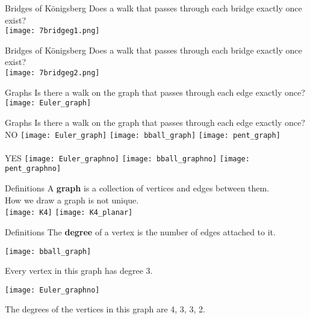 \documentclass{beamer}
\begin{document}
\begin{frame}{Bridges of Königsberg}
\centering
Does a walk that passes through each bridge exactly once exist?\\
\texttt{[image: 7bridgeg1.png]}
\end{frame}

\begin{frame}{Bridges of Königsberg}
\centering
Does a walk that passes through each bridge exactly once exist?\\
\texttt{[image: 7bridgeg2.png]}
\end{frame}
\begin{frame}{Graphs}
Is there a walk on the graph that passes through each edge exactly once?\\
\centering
\texttt{[image: Euler\_graph]}
\end{frame}
\begin{frame}{Graphs}
Is there a walk on the graph that passes through each edge exactly once?\\
NO \hfill
\texttt{[image: Euler\_graph]}\hfill
\texttt{[image: bball\_graph]}\hfill
\texttt{[image: pent\_graph]}\\
\hrulefill\vspace*{.2cm}\\
YES \hfill
\texttt{[image: Euler\_graphno]}\hfill
\texttt{[image: bball\_graphno]}\hfill
\texttt{[image: pent\_graphno]}

\end{frame}
\begin{frame}{Definitions}
A \textbf{graph} is a collection of vertices and edges between them.\\
How we draw a graph is not unique.\\
\texttt{[image: K4]}
\texttt{[image: K4\_planar]}
\end{frame}
\begin{frame}{Definitions}
The \textbf{degree} of a vertex is the number of edges attached to it.

\begin{minipage}{.5\textwidth}
\hspace*{.5cm}
\texttt{[image: bball\_graph]}
\end{minipage}
\begin{minipage}{.4\textwidth}
Every vertex in this graph has degree 3.
\end{minipage}

\begin{minipage}{.5\textwidth}
\hspace*{-.5cm}
\texttt{[image: Euler\_graphno]}
\end{minipage}
\begin{minipage}{.4\textwidth}
The degrees of the vertices in this graph are 4, 3, 3, 2.
\end{minipage}
\end{frame}
\end{document}
